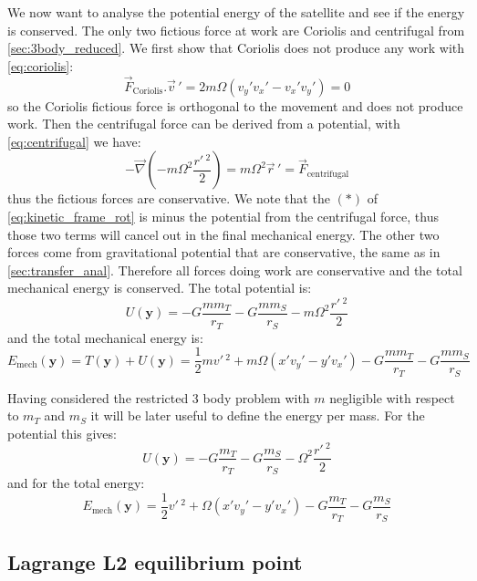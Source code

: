We now want to analyse the potential energy of the satellite and see if the energy is conserved. The only two fictious force at work are Coriolis and centrifugal from \autoref{sec:3body_reduced}. We first show that Coriolis does not produce any work with \autoref{eq:coriolis}:
\begin{equation}
    \vec{F}_\mathrm{Coriolis}.\vec{v}\,' = 2m\Omega(v_y'v_x' - v_x'v_y') = 0
\end{equation}
so the Coriolis fictious force is orthogonal to the movement and does not produce work. Then the centrifugal force can be derived from a potential, with \autoref{eq:centrifugal} we have:
\begin{equation}
    - \vec{\nabla} (-m\Omega^2 \frac{r'\,^2}{2}) = m \Omega^2 \vec{r}\,' = \vec{F}_\mathrm{centrifugal}
\end{equation}
thus the fictious forces are conservative. We note that the $(\ast)$ of \autoref{eq:kinetic_frame_rot} is minus the potential from the centrifugal force, thus those two terms will cancel out in the final mechanical energy. The other two forces come from gravitational potential that are conservative, the same as in \autoref{sec:transfer_anal}. Therefore all forces doing work are conservative and the total mechanical energy is conserved. The total potential is:
\begin{equation}
    U(\mathbf{y}) = - G \frac{mm_T}{r_T} - G \frac{mm_S}{r_S} - m\Omega^2 \frac{r'\,^2}{2}
\end{equation}
and the total mechanical energy is:
\begin{equation}
    E_\mathrm{mech}(\mathbf{y}) = T(\mathbf{y}) + U(\mathbf{y}) = \frac{1}{2}mv'\,^2 + m\Omega(x'v_y' - y'v_x') - G \frac{mm_T}{r_T} - G \frac{mm_S}{r_S}
\end{equation}

Having considered the restricted 3 body problem with $m$ negligible with respect to $m_T$ and $m_S$ it will be later useful to define the energy per mass. For the potential this gives:
\begin{equation}
    U(\mathbf{y}) = - G \frac{m_T}{r_T} - G \frac{m_S}{r_S} - \Omega^2 \frac{r'\,^2}{2}
    \label{eq:pot_per_mass}
\end{equation}
and for the total energy:
\begin{equation}
    E_\mathrm{mech}(\mathbf{y}) = \frac{1}{2}v'\,^2 + \Omega(x'v_y' - y'v_x') - G \frac{m_T}{r_T} - G \frac{m_S}{r_S}
\end{equation}


\subsection{Lagrange L2 equilibrium point}
\label{sec:lagrange_L2}

